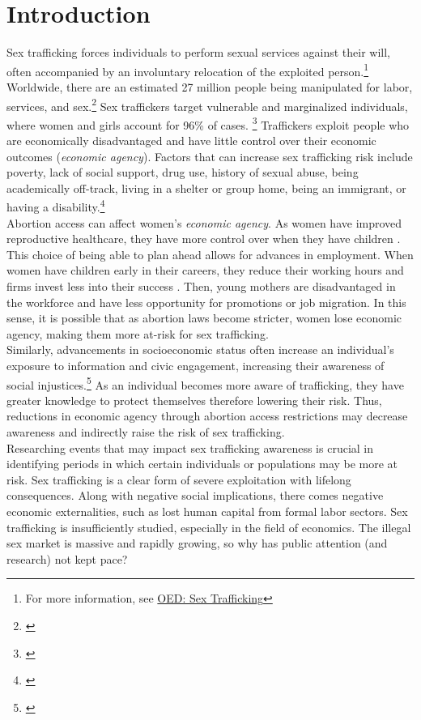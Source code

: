 \section{Introduction}
Sex trafficking forces individuals to perform sexual services against their will, often accompanied by an involuntary relocation of the exploited person.\footnote{For more information, see \href{https://www.oed.com/dictionary/sex-trafficking_n}{OED: Sex Trafficking}} Worldwide, there are an estimated 27 million people being manipulated for labor, services, and sex.\footnote{\cite{traffickingreport}} Sex traffickers target vulnerable and marginalized individuals, where women and girls account for 96\% of cases. \footnote{\cite{ICAT}} Traffickers exploit people who are economically disadvantaged and have little control over their economic outcomes (\textit{economic agency}). Factors that can increase sex trafficking risk include poverty, lack of social support, drug use, history of sexual abuse, being academically off-track, living in a shelter or group home, being an immigrant, or having a disability.\footnote{\cite{riskfactors}}  \\
\indent Abortion access can affect women's \textit{economic agency}. As women have improved reproductive healthcare, they have more control over when they have children \citep{baileyandlindo}. This choice of being able to plan ahead allows for advances in employment. When women have children early in their careers, they reduce their working hours and firms invest less into their success \citep{BlauandKhan}. Then, young mothers are disadvantaged in the workforce and have less opportunity for promotions or job migration. In this sense, it is possible that as abortion laws become stricter, women lose economic agency, making them more at-risk for sex trafficking. \\
\indent Similarly, advancements in socioeconomic status often increase an individual’s exposure to information and civic engagement, increasing their awareness of social injustices.\footnote{\cite{UrbanInstitute}} As an individual becomes more aware of trafficking, they have greater knowledge to protect themselves therefore lowering their risk. Thus, reductions in economic agency through abortion access restrictions may decrease awareness and  indirectly raise the risk of sex trafficking. \\
\indent Researching events that may impact sex trafficking awareness is crucial in identifying periods in which certain individuals or populations may be more at risk. Sex trafficking is a clear form of severe exploitation with lifelong consequences. Along with negative social implications, there comes negative economic externalities, such as lost human capital from formal labor sectors. Sex trafficking is insufficiently studied, especially in the field of economics. The illegal sex market is massive and rapidly growing, so why has public attention (and research) not kept pace? 
